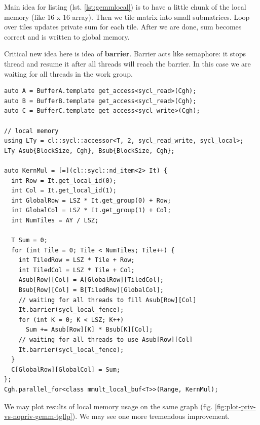\documentclass[a4paper,12pt,oneside]{article}
\begin{document}
Main idea for listing (lst. \ref{lst:gemmlocal}) is to have a little chunk of the local memory (like 16 x 16 array). Then we tile matrix into small submatrices. Loop over tiles updates private sum for each tile. After we are done, sum becomes correct and is written to global memory.

Critical new idea here is idea of \textbf{barrier}. Barrier acts like semaphore: it stops thread and resume it after all threads will reach the barrier. In this case we are waiting for all threads in the work group.

\begin{lstlisting}[caption={GEMM with local and private memory},label={lst:gemmlocal}]
auto A = BufferA.template get_access<sycl_read>(Cgh);
auto B = BufferB.template get_access<sycl_read>(Cgh);
auto C = BufferC.template get_access<sycl_write>(Cgh);

// local memory
using LTy = cl::sycl::accessor<T, 2, sycl_read_write, sycl_local>;
LTy Asub{BlockSize, Cgh}, Bsub{BlockSize, Cgh};

auto KernMul = [=](cl::sycl::nd_item<2> It) {
  int Row = It.get_local_id(0);
  int Col = It.get_local_id(1);
  int GlobalRow = LSZ * It.get_group(0) + Row;
  int GlobalCol = LSZ * It.get_group(1) + Col;
  int NumTiles = AY / LSZ;

  T Sum = 0;
  for (int Tile = 0; Tile < NumTiles; Tile++) {
    int TiledRow = LSZ * Tile + Row;
    int TiledCol = LSZ * Tile + Col;
    Asub[Row][Col] = A[GlobalRow][TiledCol];
    Bsub[Row][Col] = B[TiledRow][GlobalCol];
    // waiting for all threads to fill Asub[Row][Col]
    It.barrier(sycl_local_fence);
    for (int K = 0; K < LSZ; K++)
      Sum += Asub[Row][K] * Bsub[K][Col];
    // waiting for all threads to use Asub[Row][Col]
    It.barrier(sycl_local_fence);
  }
  C[GlobalRow][GlobalCol] = Sum;
};
Cgh.parallel_for<class mmult_local_buf<T>>(Range, KernMul);
\end{lstlisting}

We may plot results of local memory usage on the same graph (fig. \ref{fig:plot-priv-vs-nopriv-gemm-tgllp}). We may see one more tremendous improvement.
\end{document}
